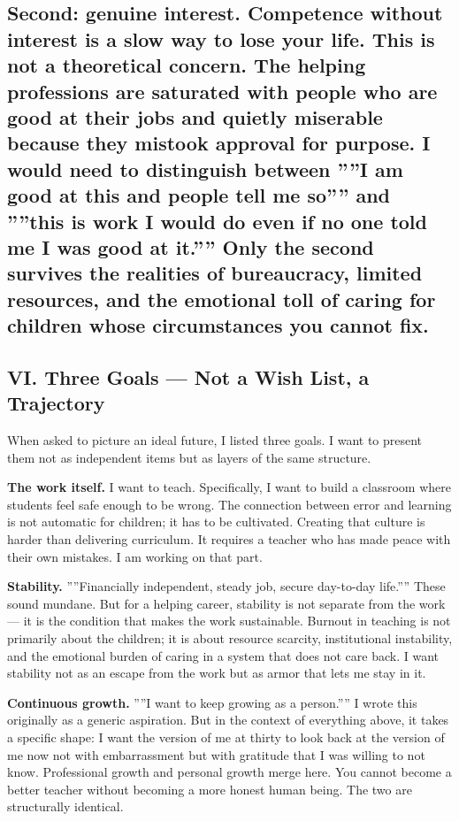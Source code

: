 \documentclass[12pt,a4paper]{article}
\begin{document}
\subsection{\textbf{Second: genuine interest.} Competence without interest is a slow way to lose your life. This is not a theoretical concern. The helping professions are saturated with people who are good at their jobs and quietly miserable because they mistook approval for purpose. I would need to distinguish between ''''I am good at this and people tell me so'''' and ''''this is work I would do even if no one told me I was good at it.'''' Only the second survives the realities of bureaucracy, limited resources, and the emotional toll of caring for children whose circumstances you cannot fix.}

\subsection{VI. Three Goals --- Not a Wish List, a Trajectory}

When asked to picture an ideal future, I listed three goals. I want to present them not as independent items but as layers of the same structure.

\textbf{The work itself.} I want to teach. Specifically, I want to build a classroom where students feel safe enough to be wrong. The connection between error and learning is not automatic for children; it has to be cultivated. Creating that culture is harder than delivering curriculum. It requires a teacher who has made peace with their own mistakes. I am working on that part.

\textbf{Stability.} ''''Financially independent, steady job, secure day-to-day life.'''' These sound mundane. But for a helping career, stability is not separate from the work --- it is the condition that makes the work sustainable. Burnout in teaching is not primarily about the children; it is about resource scarcity, institutional instability, and the emotional burden of caring in a system that does not care back. I want stability not as an escape from the work but as armor that lets me stay in it.

\textbf{Continuous growth.} ''''I want to keep growing as a person.'''' I wrote this originally as a generic aspiration. But in the context of everything above, it takes a specific shape: I want the version of me at thirty to look back at the version of me now not with embarrassment but with gratitude that I was willing to not know. Professional growth and personal growth merge here. You cannot become a better teacher without becoming a more honest human being. The two are structurally identical.
\end{document}
